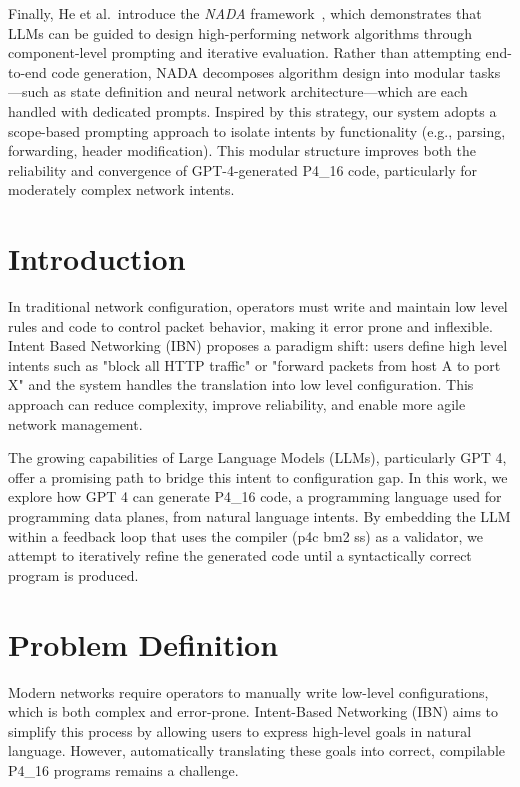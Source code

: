 \documentclass[sigconf]{acmart}
\begin{document}
Finally, He et al.\ introduce the \textit{NADA} framework~\cite{he2024nada}, which demonstrates that LLMs can be guided to design high-performing network algorithms through component-level prompting and iterative evaluation. Rather than attempting end-to-end code generation, NADA decomposes algorithm design into modular tasks—such as state definition and neural network architecture—which are each handled with dedicated prompts. Inspired by this strategy, our system adopts a scope-based prompting approach to isolate intents by functionality (e.g., parsing, forwarding, header modification). This modular structure improves both the reliability and convergence of GPT-4-generated P4\_16 code, particularly for moderately complex network intents.

\section{Introduction}
In traditional network configuration, operators must write and maintain low level rules and code to control packet behavior, making it error prone and inflexible. Intent Based Networking (IBN) proposes a paradigm shift: users define high level intents such as "block all HTTP traffic" or "forward packets from host A to port X" and the system handles the translation into low level configuration. This approach can reduce complexity, improve reliability, and enable more agile network management.

The growing capabilities of Large Language Models (LLMs), particularly GPT 4, offer a promising path to bridge this intent to configuration gap. In this work, we explore how GPT 4 can generate P4\_16 code, a programming language used for programming data planes, from natural language intents. By embedding the LLM within a feedback loop that uses the compiler (p4c bm2 ss) as a validator, we attempt to iteratively refine the generated code until a syntactically correct program is produced.
 

\section{Problem Definition}
Modern networks require operators to manually write low-level configurations, which is both complex and error-prone. Intent-Based Networking (IBN) aims to simplify this process by allowing users to express high-level goals in natural language. However, automatically translating these goals into correct, compilable P4\_16 programs remains a challenge.
\end{document}
